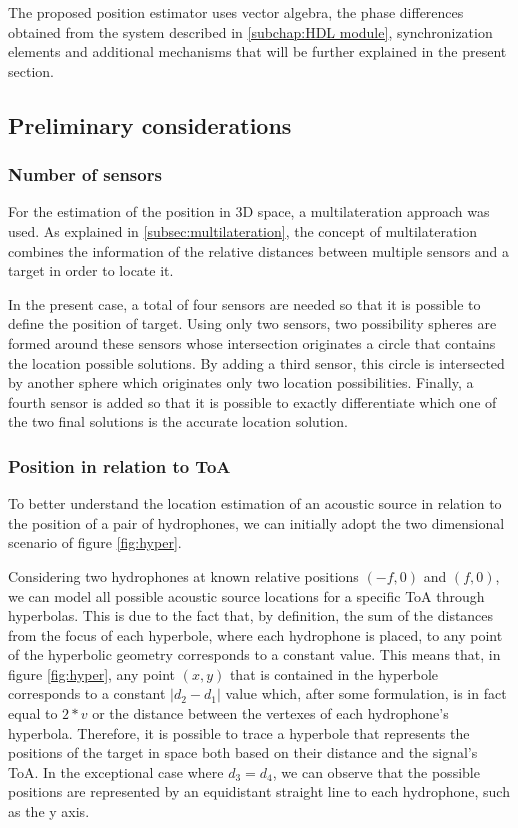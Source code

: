 The proposed position estimator uses vector algebra, the phase differences obtained from the system described in \ref{subchap:HDL module}, synchronization elements and additional mechanisms that will be further explained in the present section.

\subsection{Preliminary considerations}

\subsubsection{Number of sensors}
For the estimation of the position in 3D space, a multilateration approach was used. As explained in \ref{subsec:multilateration}, the concept of multilateration combines the information of the relative distances between multiple sensors and a target in order to locate it. 

In the present case, a total of four sensors are needed so that it is possible to define the position of target. Using only two sensors, two possibility spheres are formed around these sensors whose intersection originates a circle that contains the location possible solutions. By adding a third sensor, this circle is intersected by another sphere which originates only two location possibilities. Finally, a fourth sensor is added so that it is possible to exactly differentiate which one of the two final solutions is the accurate location solution. 

\subsubsection{Position in relation to ToA}
To better understand the location estimation of an acoustic source in relation to the position of a pair of hydrophones, we can initially adopt the two dimensional scenario of figure \ref{fig:hyper}. 

Considering two hydrophones at known relative positions $(-f,0)$ and $(f,0)$, we can model all possible acoustic source locations for a specific ToA through hyperbolas. This is due to the fact that, by definition, the sum of the distances from the focus of each hyperbole, where each hydrophone is placed, to any point of the hyperbolic geometry corresponds to a constant value. 
This means that, in figure \ref{fig:hyper}, any point $(x,y)$ that is contained in the hyperbole corresponds to a constant $|d_2-d_1|$ value which, after some formulation, is in fact equal to $2*v$ or the distance between the vertexes of each hydrophone's hyperbola. Therefore, it is possible to trace a hyperbole that represents the positions of the target in space both based on their distance and the signal's ToA. In the exceptional case where $d_3=d_4$, we can observe that the possible positions are represented by an equidistant straight line to each hydrophone, such as the y axis.

